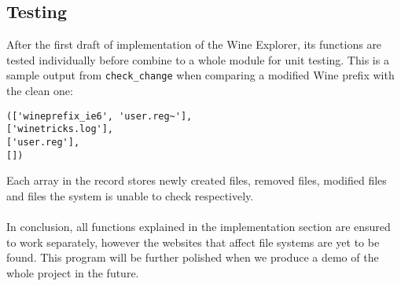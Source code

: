 \subsection{Testing}
After the first draft of implementation of the Wine Explorer, its functions are
tested individually before combine to a whole module for unit testing. This is a sample 
output from \verb'check_change' when comparing a modified Wine prefix with 
the clean one:
\begin{verbatim}
(['wineprefix_ie6', 'user.reg~'], 
['winetricks.log'], 
['user.reg'], 
[])
\end{verbatim}
Each array in the record stores newly created files, removed files, 
modified files and files the system is unable to check respectively. 
\paragraph{}
In conclusion, all functions 
explained in the implementation section are ensured to work separately, 
however the websites that affect file systems are yet to be found. 
This program will be further polished when we produce a demo 
of the whole project in the future. 



